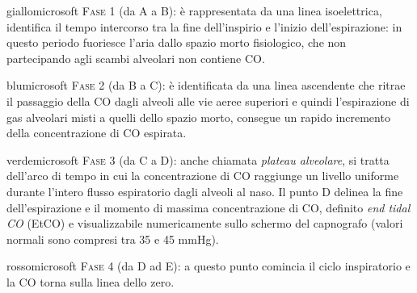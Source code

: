 \begin{fancybox}{giallomicrosoft}
    \textsc{Fase 1} \small{(da A a B)}: è rappresentata da una linea isoelettrica, identifica il tempo intercorso tra la fine dell’inspirio e l’inizio dell’espirazione: in questo periodo fuoriesce l'aria dallo spazio morto fisiologico, che non partecipando agli scambi alveolari non contiene CO.
\end{fancybox}

\begin{fancybox}{blumicrosoft}
\textsc{Fase 2} \small{(da B a C)}: è identificata da una linea ascendente che ritrae il passaggio della CO dagli alveoli alle vie aeree superiori e quindi l'espirazione di gas alveolari misti a quelli dello spazio morto, consegue un rapido incremento della concentrazione di CO espirata.
    
\end{fancybox}

\begin{fancybox}{verdemicrosoft}
\textsc{Fase 3} \small{(da C a D)}: anche chiamata \emph{plateau alveolare}, si tratta dell'arco di tempo in cui la concentrazione di CO raggiunge un livello uniforme durante l'intero flusso espiratorio dagli alveoli al naso. Il punto D delinea la fine dell'espirazione e il momento di massima concentrazione di CO, definito \emph{end tidal CO} (EtCO) e visualizzabile numericamente sullo schermo del capnografo (valori normali sono compresi tra 35 e 45 mmHg).

\end{fancybox}

\begin{fancybox}{rossomicrosoft}
\textsc{Fase 4} \small{(da D ad E)}: a questo punto comincia il ciclo inspiratorio e la CO torna sulla linea dello zero. 

\end{fancybox}

